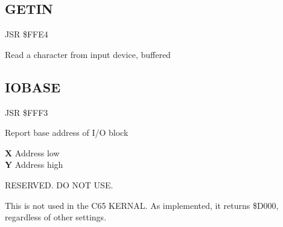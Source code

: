 
\newpage
\subsection{GETIN}
\label{KERNAL Jump Table!GETIN}
\begin{description}[leftmargin=2cm,style=nextline]
    \item [Address:] JSR \$FFE4
    \item [Description:] Read a character from input device, buffered
    \item [Inputs:]
    \item [Outputs:]
    \item [Remarks:]
    \item [Example:]
\end{description}



\newpage
\subsection{IOBASE}
\label{KERNAL Jump Table!IOBASE}
\begin{description}[leftmargin=2cm,style=nextline]
    \item [Address:] JSR \$FFF3
    \item [Description:] Report base address of I/O block
    \item [Outputs:]
        \textbf{X} Address low \\
        \textbf{Y} Address high
    \item [Remarks:]
        RESERVED. DO NOT USE.

        This is not used in the C65 KERNAL. As implemented, it returns \$D000, regardless of other settings.
    \item [Example:]
\end{description}



\newpage
